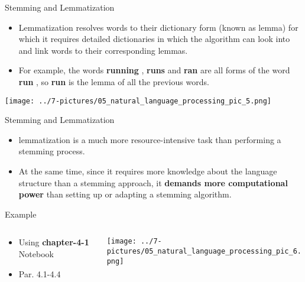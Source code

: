 \documentclass[11pt]{beamer}
\begin{document}
\begin{frame}{Stemming and Lemmatization}
	\begin{itemize}
		\item Lemmatization resolves words to their dictionary form (known as lemma) for which it requires detailed dictionaries in which the algorithm can look into and link words to their corresponding lemmas.
		\item For example, the words \textbf{running }, \textbf{ runs }  and  \textbf{ ran }  are all forms of the word \textbf{ run }, so \textbf{ run} is the lemma of all the previous words.
	\end{itemize}
	\begin{center}
	\texttt{[image: ../7-pictures/05\_natural\_language\_processing\_pic\_5.png]}
	\end{center}
\end{frame}
\begin{frame}{Stemming and Lemmatization}
	\begin{itemize}
		\item lemmatization is a much more resource-intensive task than performing a stemming process. 
		\item At the same time, since it requires more knowledge about the language structure than a stemming approach, it \textbf{demands more computational power} than setting up or adapting a stemming algorithm.
	\end{itemize}
\end{frame}
\begin{frame}{Example}
\begin{columns}[T] %
\begin{column}{.48\textwidth}
        \begin{itemize}
		\item Using \textbf{chapter-4-1} Notebook 
		\item Par. 4.1-4.4
        \end{itemize}
\end{column}%
\hfill%
\begin{column}{.48\textwidth}
        \texttt{[image: ../7-pictures/05\_natural\_language\_processing\_pic\_6.png]}
\end{column}%
\end{columns}
\end{frame}
\end{document}
